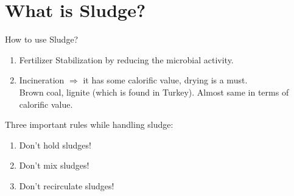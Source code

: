 \documentclass{article}
\numberwithin{equation}{section}
\begin{document}
\section{What is Sludge?}
How to use Sludge?
\begin{enumerate}
    \item Fertilizer
    Stabilization by reducing the microbial activity.
    \item Incineration $\Rightarrow$ it has some calorific value, drying is a must.\\
    Brown coal, lignite (which is found in Turkey). Almost same in terms of calorific value.
\end{enumerate}
Three important rules while handling sludge:
\begin{enumerate}
    \item Don't hold sludges!
    \item Don't mix sludges!
    \item Don't recirculate sludges!
\end{enumerate}
\end{document}
